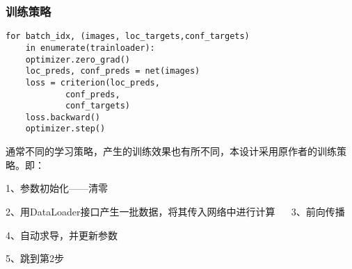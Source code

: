 \subsubsection{训练策略}
\begin{lstlisting}[caption={训练方法}]
for batch_idx, (images, loc_targets,conf_targets) 
	in enumerate(trainloader):
	optimizer.zero_grad()
	loc_preds, conf_preds = net(images)
	loss = criterion(loc_preds,
			conf_preds,
			conf_targets)
	loss.backward()
	optimizer.step()
\end{lstlisting}

通常不同的学习策略，产生的训练效果也有所不同，本设计采用原作者的训练策略。即：

1、参数初始化——清零

2、用DataLoader接口产生一批数据，将其传入网络中进行计算
　
3、前向传播

4、自动求导，并更新参数

5、跳到第2步
